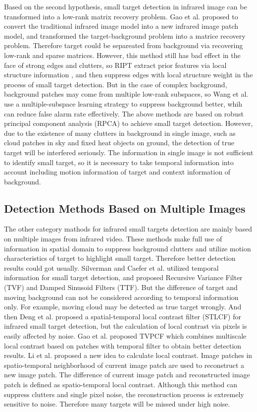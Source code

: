 \documentclass[journal]{IEEEtran}
\begin{document}
Based on the second hypothesis, small target detection in infrared image can be transformed into a low-rank matrix recovery problem. Gao et al.\cite{gao2013infrared} proposed to convert the traditional infrared image model into a new infrared image patch model, and transformed the target-background problem into a matrice recovery problem. Therefore target could be separeated from background via recovering low-rank and sparse matrices. However, this method still has bad effect in the face of strong edges and clutters, so RIPT\cite{dai2017reweighted} extract prior features via local structure information , and then suppress edges with local structure weight in the process of small target detection. But in the case of complex background, background patches may come from multiple low-rank subspaces, so Wang et al.\cite{wang2017infrared} use a multiple-subspace learning strategy to suppress background better, whih can reduce false alarm rate effectively. The above methods are based on robust principal component analysis (RPCA) to achieve small target detection. However, due to the existence of many clutters in background in single image, such as cloud patches in sky and fixed heat objects on ground, the detection of true target will be interfered seriously. The information in single image is not sufficient to identify small target, so it is necessary to take temporal information into account including motion information of target and context information of background.

\subsection{Detection Methods Based on Multiple Images}
The other category mathods for infrared small targets detection are mainly based on multiple images from infrared video. These methods make full use of information in spatial domain to suppress background clutters and utilize motion characteristics of target to highlight small target. Therefore better detection results could got usually. Silverman and Caefer et al. utilized temporal information for small target detection, and proposed Recursive Variance Filter (TVF)\cite{silverman1998temporal} and Damped Sinusoid Filters (TTF)\cite{caefer1998temporal}. But the difference of target and moving background can not be considered according to temporal information only. For example, moving cloud may be detected as true target wrongly. And then Deng et al.\cite{deng2016infrared} proposed a spatial-temporal local contrast filter (STLCF) for infrared small target detection, but the calculation of local contrast via pixels is easily affected by noise. Gao et al. proposed TVPCF\cite{gao2017tvpcf} which combines multiscale local contrast based on patches with temporal filter to obtain better detection results. Li et al.\cite{li2016novel} proposed a new idea to calculate local contrast. Image patches in spatio-temporal neighborhood of current image patch are used to reconstruct a new image patch. The difference of current image patch and reconstructed image patch is defined as spatio-temporal local contrast. Although this method can suppress clutters and single pixel noise, the reconstruction process is extremely sensitive to noise. Therefore many targets will be missed under high noise.
\end{document}
